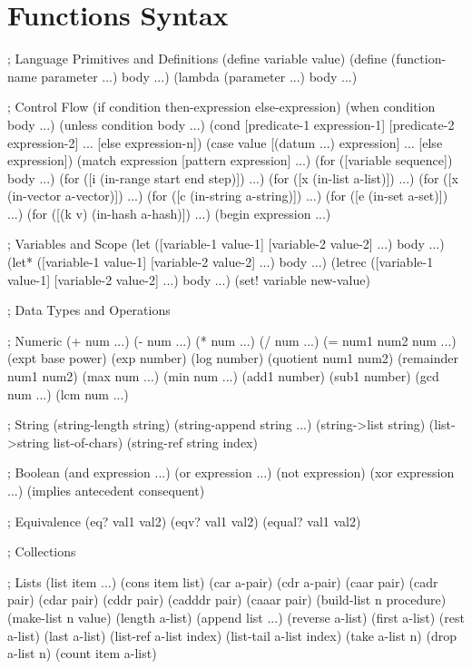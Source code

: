 \section{Functions Syntax}

\begin{racketcode}
; Language Primitives and Definitions
(define variable value)
(define (function-name parameter ...) body ...)
(lambda (parameter ...) body ...)

; Control Flow
(if condition then-expression else-expression)
(when condition body ...)
(unless condition body ...)
(cond [predicate-1 expression-1] [predicate-2 expression-2] ... [else expression-n])
(case value [(datum ...) expression] ... [else expression])
(match expression [pattern expression] ...)
(for ([variable sequence]) body ...)
(for ([i (in-range start end step)]) ...)
(for ([x (in-list a-list)]) ...)
(for ([x (in-vector a-vector)]) ...)
(for ([c (in-string a-string)]) ...)
(for ([e (in-set a-set)]) ...)
(for ([(k v) (in-hash a-hash)]) ...)
(begin expression ...)

; Variables and Scope
(let ([variable-1 value-1] [variable-2 value-2] ...) body ...)
(let* ([variable-1 value-1] [variable-2 value-2] ...) body ...)
(letrec ([variable-1 value-1] [variable-2 value-2] ...) body ...)
(set! variable new-value)

; Data Types and Operations

; Numeric
(+ num ...)
(- num ...)
(* num ...)
(/ num ...)
(= num1 num2 num ...)
(expt base power)
(exp number)
(log number)
(quotient num1 num2)
(remainder num1 num2)
(max num ...)
(min num ...)
(add1 number)
(sub1 number)
(gcd num ...)
(lcm num ...)

; String
(string-length string)
(string-append string ...)
(string->list string)
(list->string list-of-chars)
(string-ref string index)

; Boolean
(and expression ...)
(or expression ...)
(not expression)
(xor expression ...)
(implies antecedent consequent)

; Equivalence
(eq? val1 val2)
(eqv? val1 val2)
(equal? val1 val2)

; Collections

; Lists
(list item ...)
(cons item list)
(car a-pair)
(cdr a-pair)
(caar pair)
(cadr pair)
(cdar pair)
(cddr pair)
(cadddr pair)
(caaar pair)
(build-list n procedure)
(make-list n value)
(length a-list)
(append list ...)
(reverse a-list)
(first a-list)
(rest a-list)
(last a-list)
(list-ref a-list index)
(list-tail a-list index)
(take a-list n)
(drop a-list n)
(count item a-list)


\end{racketcode}
